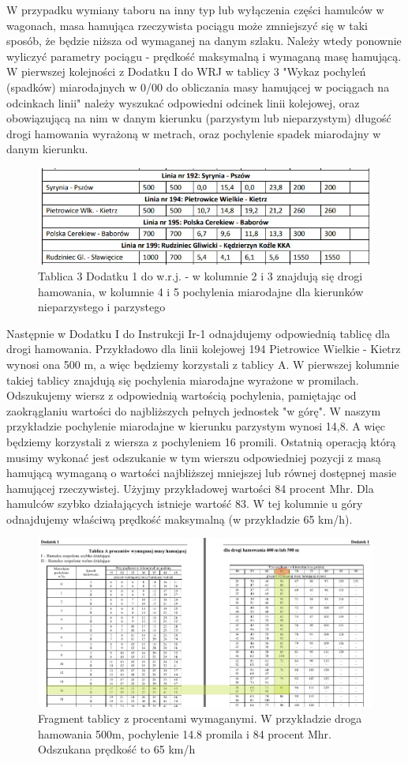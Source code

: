 W przypadku wymiany taboru na inny typ lub wyłączenia części hamulców w wagonach, masa hamująca rzeczywista pociągu może zmniejszyć się w taki sposób, że będzie niższa od wymaganej na danym szlaku. Należy wtedy ponownie wyliczyć parametry pociągu - prędkość maksymalną i wymaganą masę hamującą. 
W pierwszej kolejności z Dodatku I do WRJ w tablicy 3 "Wykaz pochyleń (spadków) miarodajnych w 0/00 do obliczania masy hamującej w pociągach na odcinkach linii" należy wyszukać odpowiedni odcinek linii kolejowej, oraz obowiązującą na nim w danym kierunku (parzystym lub nieparzystym) długość drogi hamowania wyrażoną w metrach, oraz pochylenie spadek miarodajny w danym kierunku.
\begin{figure}
	\includegraphics[width=12cm]{skryptkierownik-img/tabela-d1-warunki.jpg}
	\caption{Tablica 3 Dodatku 1 do w.r.j. - w kolumnie 2 i 3 znajdują się drogi hamowania, w kolumnie 4 i 5 pochylenia miarodajne dla kierunków nieparzystego i parzystego}
\end{figure}
Następnie w Dodatku I do Instrukcji Ir-1 odnajdujemy odpowiednią tablicę dla drogi hamowania. Przykładowo dla linii kolejowej 194 Pietrowice Wielkie - Kietrz wynosi ona 500 m, a więc będziemy korzystali z tablicy A. W pierwszej kolumnie takiej tablicy znajdują się pochylenia miarodajne wyrażone w promilach. Odszukujemy wiersz z odpowiednią wartością pochylenia, pamiętając od zaokrąglaniu wartości do najbliższych pełnych jednostek "w górę". W naszym przykładzie pochylenie miarodajne w kierunku parzystym wynosi 14,8. A więc będziemy korzystali z wiersza z pochyleniem 16 promili.
Ostatnią operacją którą musimy wykonać jest odszukanie w tym wierszu odpowiedniej pozycji z masą hamującą wymaganą o wartości najbliższej mniejszej lub równej dostępnej masie hamującej rzeczywistej. Użyjmy przykładowej wartości 84 procent Mhr. Dla hamulców szybko działających istnieje wartość 83. W tej kolumnie u góry odnajdujemy właściwą prędkość maksymalną (w przykładzie 65 km/h).
\begin{figure}
	\includegraphics[width=13cm]{skryptkierownik-img/tablica-ir1.jpg}
	\caption{Fragment tablicy z procentami wymaganymi. W przykładzie droga hamowania 500m, pochylenie 14.8 promila i 84 procent Mhr. Odszukana prędkość to 65 km/h}
\end{figure}
